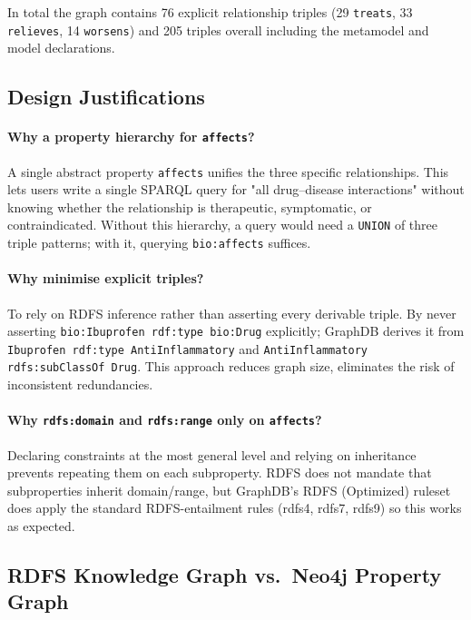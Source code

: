 \documentclass[11pt,a4paper]{article}
\begin{document}
In total the graph contains 76 explicit relationship triples (29 \texttt{treats},
33 \texttt{relieves}, 14 \texttt{worsens}) and 205 triples overall including the
metamodel and model declarations.

\subsection{Design Justifications}
\label{subsec:design}

\paragraph{Why a property hierarchy for \texttt{affects}?}
A single abstract property \texttt{affects} unifies the three specific
relationships.  This lets users write a single
SPARQL query for "all drug–disease interactions" without knowing 
whether the relationship is therapeutic, symptomatic, or contraindicated.
Without this hierarchy, a query would need a \texttt{UNION} of three triple
patterns; with it, querying \texttt{bio:affects} suffices.

\paragraph{Why minimise explicit triples?}
To rely on RDFS inference rather
than asserting every derivable triple. By never asserting
\texttt{bio:Ibuprofen rdf:type bio:Drug} explicitly; GraphDB derives it from
\texttt{Ibuprofen rdf:type AntiInflammatory} and
\texttt{AntiInflammatory rdfs:subClassOf Drug}.
This approach reduces graph size, eliminates the risk of inconsistent redundancies.

\paragraph{Why \texttt{rdfs:domain} and \texttt{rdfs:range} only on \texttt{affects}?}
Declaring constraints at the most general level and relying on inheritance
prevents repeating them on each subproperty.  RDFS does not mandate that
subproperties inherit domain/range, but GraphDB's RDFS (Optimized) ruleset
does apply the standard RDFS-entailment rules (rdfs4, rdfs7, rdfs9) so this
works as expected.



\subsection{RDFS Knowledge Graph vs.\ Neo4j Property Graph}
\end{document}
